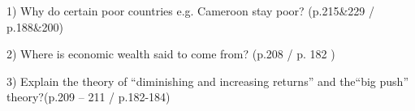1) Why do certain poor countries e.g. Cameroon stay poor? (p.215\&229 / p.188\&200)

2) Where is economic wealth said to come from? (p.208 / p. 182 )

3) Explain the theory of \enquote{diminishing and increasing returns} and the\enquote{big push} theory?(p.209 – 211 / p.182-184)